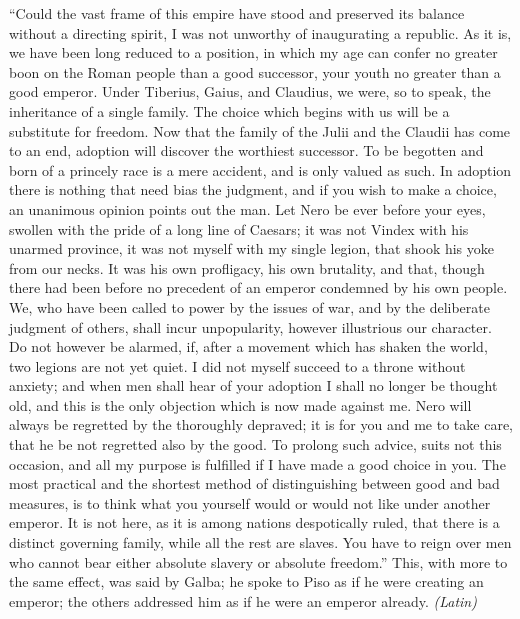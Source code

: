 ``Could the vast frame of this empire have stood and preserved its balance without a directing spirit, I was not unworthy of inaugurating a republic. As it is, we have been long reduced to a position, in which my age can confer no greater boon on the Roman people than a good successor, your youth no greater than a good emperor. Under Tiberius, Gaius, and Claudius, we were, so to speak, the inheritance of a single family. The choice which begins with us will be a substitute for freedom. Now that the family of the Julii and the Claudii has come to an end, adoption will discover the worthiest successor. To be begotten and born of a princely race is a mere accident, and is only valued as such. In adoption there is nothing that need bias the judgment, and if you wish to make a choice, an unanimous opinion points out the man. Let Nero be ever before your eyes, swollen with the pride of a long line of Caesars; it was not Vindex with his unarmed province, it was not myself with my single legion, that shook his yoke from our necks. It was his own profligacy, his own brutality, and that, though there had been before no precedent of an emperor condemned by his own people. We, who have been called to power by the issues of war, and by the deliberate judgment of others, shall incur unpopularity, however illustrious our character. Do not however be alarmed, if, after a movement which has shaken the world, two legions are not yet quiet. I did not myself succeed to a throne without anxiety; and when men shall hear of your adoption I shall no longer be thought old, and this is the only objection which is now made against me. Nero will always be regretted by the thoroughly depraved; it is for you and me to take care, that he be not regretted also by the good. To prolong such advice, suits not this occasion, and all my purpose is fulfilled if I have made a good choice in you. The most practical and the shortest method of distinguishing between good and bad measures, is to think what you yourself would or would not like under another emperor. It is not here, as it is among nations despotically ruled, that there is a distinct governing family, while all the rest are slaves. You have to reign over men who cannot bear either absolute slavery or absolute freedom.'' This, with more to the same effect, was said by Galba; he spoke to Piso as if he were creating an emperor; the others addressed him as if he were an emperor already. \emph{(Latin)}


